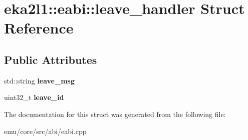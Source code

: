 \hypertarget{structeka2l1_1_1eabi_1_1leave__handler}{}\section{eka2l1\+:\+:eabi\+:\+:leave\+\_\+handler Struct Reference}
\label{structeka2l1_1_1eabi_1_1leave__handler}
\subsection*{Public Attributes}
\begin{DoxyCompactItemize}
\item 
\mbox{\label{structeka2l1_1_1eabi_1_1leave__handler_a08997b8b05ab123ba5efa70de96fe13c}} 
std\+::string {\bfseries leave\+\_\+msg}
\item 
\mbox{\label{structeka2l1_1_1eabi_1_1leave__handler_a143213890bda6f935697c64de52d7075}} 
uint32\+\_\+t {\bfseries leave\+\_\+id}
\end{DoxyCompactItemize}


The documentation for this struct was generated from the following file\+:\begin{DoxyCompactItemize}
\item 
emu/core/src/abi/eabi.\+cpp\end{DoxyCompactItemize}
